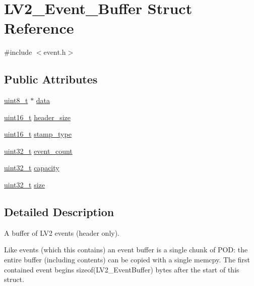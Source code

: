 \hypertarget{struct_l_v2___event___buffer}{}\section{L\+V2\+\_\+\+Event\+\_\+\+Buffer Struct Reference}
\label{struct_l_v2___event___buffer}


{\ttfamily \#include $<$event.\+h$>$}

\subsection*{Public Attributes}
\begin{DoxyCompactItemize}
\item 
\hyperlink{lib-src_2ffmpeg_2win32_2stdint_8h_a9a941819355e6f658991890ff66b4b0e}{uint8\+\_\+t} $\ast$ \hyperlink{struct_l_v2___event___buffer_af00623cdbbddc31900cb377fb562f576}{data}
\item 
\hyperlink{lib-src_2ffmpeg_2win32_2stdint_8h_a30af71eaf40c925c9832eb289a48da35}{uint16\+\_\+t} \hyperlink{struct_l_v2___event___buffer_ad4ac56627744b17134c2bef97752d891}{header\+\_\+size}
\item 
\hyperlink{lib-src_2ffmpeg_2win32_2stdint_8h_a30af71eaf40c925c9832eb289a48da35}{uint16\+\_\+t} \hyperlink{struct_l_v2___event___buffer_a1ae050b6afc0511b9bf8af655ae295e1}{stamp\+\_\+type}
\item 
\hyperlink{lib-src_2ffmpeg_2win32_2stdint_8h_a6eb1e68cc391dd753bc8ce896dbb8315}{uint32\+\_\+t} \hyperlink{struct_l_v2___event___buffer_a0de99fadad573a09ec67623e94cd2b96}{event\+\_\+count}
\item 
\hyperlink{lib-src_2ffmpeg_2win32_2stdint_8h_a6eb1e68cc391dd753bc8ce896dbb8315}{uint32\+\_\+t} \hyperlink{struct_l_v2___event___buffer_ab5d1551ce2b049bd4b7c8840996b9b3f}{capacity}
\item 
\hyperlink{lib-src_2ffmpeg_2win32_2stdint_8h_a6eb1e68cc391dd753bc8ce896dbb8315}{uint32\+\_\+t} \hyperlink{struct_l_v2___event___buffer_ac3d68812737a6e7ccd5218209fd1e420}{size}
\end{DoxyCompactItemize}


\subsection{Detailed Description}
A buffer of L\+V2 events (header only).

Like events (which this contains) an event buffer is a single chunk of P\+OD\+: the entire buffer (including contents) can be copied with a single memcpy. The first contained event begins sizeof(\+L\+V2\+\_\+\+Event\+Buffer) bytes after the start of this struct.

